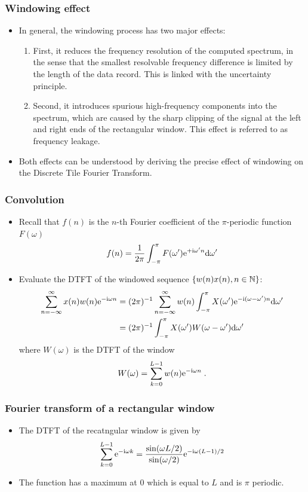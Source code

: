 \begin{frame}
\frametitle{Windowing effect}
\begin{itemize}
\item In general, the windowing process has two major effects:
\begin{enumerate}
\item First, it reduces the \alert{frequency resolution} of the computed spectrum, in the sense that the \alert{smallest resolvable frequency} difference is limited by the length of the data record. This is linked with the \alert{uncertainty principle.}
 \item Second, it introduces \alert{spurious} high-frequency components into the spectrum, which are caused by the sharp clipping of the signal at the left and right ends of the rectangular window. This effect is referred to as \alert{frequency leakage.}
\end{enumerate}
\item Both effects can be understood by deriving the precise effect of windowing on the Discrete Tile Fourier Transform.
\end{itemize}
\end{frame}

\begin{frame}
\frametitle{Convolution}
\begin{itemize}
\item Recall that $f(n)$ is the $n$-th Fourier coefficient of the $\pi$-periodic function $F(\omega)$
\[
f(n) = \frac{1}{2 \pi} \int_{-\pi}^{\pi} F(\omega') \mathrm{e}^{+ \mathrm{i} \omega' n} \mathrm{d} \omega'
\]
\item Evaluate the DTFT of the windowed sequence $\{ w(n) x(n), n \in \mathbb{N}\}$:
\begin{align*}
\sum_{n=-\infty}^{\infty} x(n) w(n) \mathrm{e}^{-\mathrm{i} \omega n} &= (2 \pi)^{-1} \sum_{n=-\infty}^{\infty} w(n) \int_{-\pi}^{\pi} X(\omega') \mathrm{e}^{-\mathrm{i} (\omega-\omega') n} \mathrm{d} \omega' \\
&= (2\pi)^{-1} \int_{-\pi}^\pi X(\omega') W(\omega - \omega') \mathrm{d} \omega'
\end{align*}
where $W(\omega)$ is the DTFT of the window
\[
W(\omega)= \sum_{k=0}^{L-1} w(n) \mathrm{e}^{-\mathrm{i} \omega n} \;.
\]
\end{itemize}
\end{frame}

\begin{frame}
\frametitle{Fourier transform of a rectangular window}
\begin{itemize}
\item The DTFT of the recatngular window is given by
\[
\sum_{k=0}^{L-1} \mathrm{e}^{-\mathrm{i} \omega k}= \frac{\sin(\omega L/2)}{\sin(\omega/2)} \mathrm{e}^{- \mathrm{i} \omega (L-1)/2}
\]
\item The function has a maximum at $0$ which is equal to $L$ and is $\pi$ periodic.
\end{itemize}
\end{frame}

